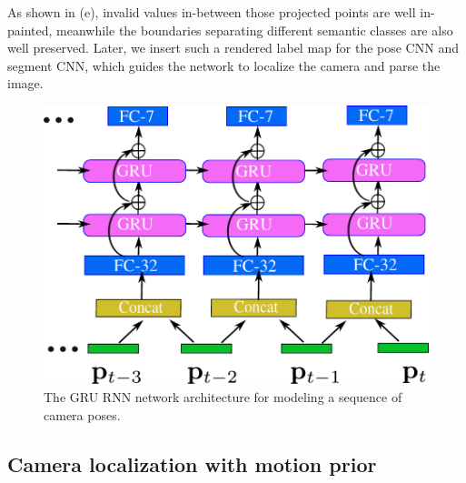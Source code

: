 As shown in (e), invalid values in-between those projected points are well in-painted, meanwhile the boundaries separating different semantic classes are also well preserved. Later, we insert such a rendered label map for the pose CNN and segment CNN, which guides the network to localize the camera and parse the image.

\begin{figure}[t]
\begin{center}
\includegraphics[width=.8\linewidth]{fig/RNN.pdf}
\end{center}
   \caption{The GRU RNN network architecture for modeling a sequence of camera poses.}
\label{fig:rnn}
\vspace{-1.3\baselineskip}
\end{figure}

\vspace{-0.3\baselineskip}
\subsection{Camera localization with motion prior}
\vspace{-0.2\baselineskip}

